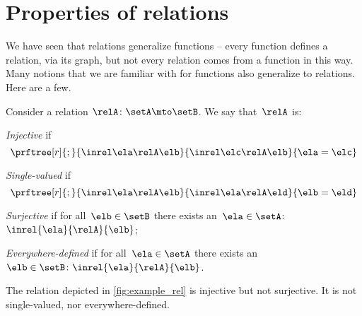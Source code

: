 
\section{Properties of relations}
We have seen that relations generalize functions -- every function defines a relation, via its graph, but not every relation comes from a function in this way.
Many notions that we are familiar with for functions also generalize to relations.
Here are a few.

\begin{ctdefinition}
    \label{def:rel_properties}
    Consider a relation $\relA \colon \setA \mto \setB$.
    We say that~$\relA$ is:
    \begin{compactenum}
        \item \emph{Injective} if
        \begin{equation}
            \prftree[r]{;}{
                \inrel \ela \relA \elb
            }{
                \inrel \elc \relA \elb
            }{
                \ela=\elc
            }
        \end{equation}
        \item \emph{Single-valued} if
        \begin{equation}
            \prftree[r]{;}{
                \inrel \ela \relA \elb
            }{
                \inrel \ela \relA \eld
            }{
                \elb = \eld
            }
        \end{equation}
        \item \emph{Surjective} if for all~$\elb\in \setB$ there exists an~$\ela\in \setA$:~$\inrel{\ela}{\relA}{\elb}$;
        \item \emph{Everywhere-defined} if for all~$\ela\in \setA$ there exists an ~$\elb \in \setB\colon \inrel{\ela}{\relA}{\elb}$.
    \end{compactenum}
\end{ctdefinition}

\begin{example}
    The relation depicted in \cref{fig:example_rel} is injective but not surjective.
    It is not single-valued, nor everywhere-defined.
\end{example}

